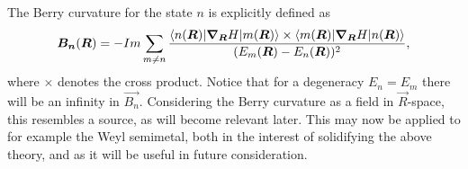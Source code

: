 The Berry curvature for the state $n$ is explicitly defined as~\cite{berryQuantalPhaseFactors1984}
\begin{equation}
  \bm{B_n}(\bm{R}) =
  -Im \sum_{m\neq n}
  \frac{
    \braket{n(\bm{R}) | \bm{\nabla}_{\bm{R}} H | m(\bm{R}) }
    \times
    \braket{m(\bm{R}) | \bm{\nabla}_{\bm{R}} H | n(\bm{R}) }
  }{
    (E_m(\bm{R}) - E_n(\bm{R}))^2
  },
\end{equation}
where $\times $ denotes the cross product.
Notice that for a degeneracy $E_n = E_m$ there will be an infinity in $\vec{B_n}$.
Considering the Berry curvature as a field in $\vec{R}$-space, this resembles a source, as will become relevant later.
This may now be applied to for example the Weyl semimetal, both in the interest of solidifying the above theory, and as it will be useful in future consideration.

